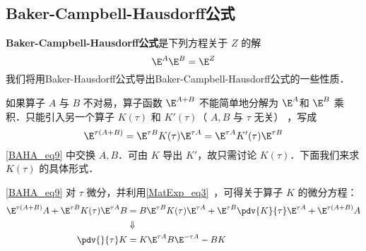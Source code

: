 \subsection{Baker-Campbell-Hausdorff公式}
\textbf{Baker-Campbell-Hausdorff公式}是下列方程关于 $Z$ 的解
\begin{equation}
\E^{A}\E^{B}=\E^{Z}
\end{equation}
我们将用Baker-Hausdorff公式导出Baker-Campbell-Hausdorff公式的一些性质．

如果算子 $A$ 与 $B$ 不对易，算子函数 $\E^{A+B}$ 不能简单地分解为  $\E^{A}$和 $\E^{B}$ 乘积．只能引入另一个算子 $K(\tau)$ 和 $K'(\tau)$（ $A,B$ 与 $\tau$ 无关） ，写成
\begin{equation}\label{BAHA_eq9}
\E^{\tau(A+B)}=\E^{\tau B}K(\tau)\E^{\tau A}=\E^{\tau A}K'(\tau)\E^{\tau B}
\end{equation}
\autoref{BAHA_eq9} 中交换 $A,B$．可由 $K$ 导出 $K'$，故只需讨论 $K(\tau)$．下面我们来求 $K(\tau)$ 的具体形式．

\autoref{BAHA_eq9} 对 $\tau$ 微分，并利用\autoref{MatExp_eq3}~，可得关于算子 $K$ 的微分方程：
\begin{equation}\label{BAHA_eq10}
\begin{aligned}
\E^{\tau(A+B)}A+\E^{\tau B}K(\tau)\E^{\tau A}B&=B\E^{\tau B}K(\tau)\E^{\tau A}+\E^{\tau B}\pdv{K}{\tau}\E^{\tau A}+\E^{\tau(A+B)}A\\
&\Downarrow\\
\pdv{}{\tau}K&=K\E^{\tau A}B\E^{-\tau A}-BK
\end{aligned}
\end{equation}

